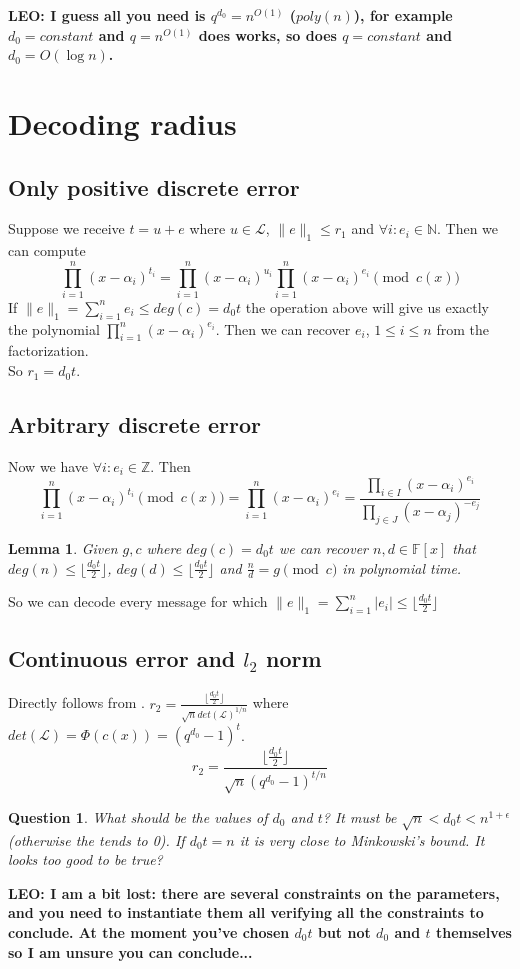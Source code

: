 \documentclass[12pt]{article}
\newcommand{\floor}[1]{\lfloor #1 \rfloor}
\newtheorem{question}{Question}
\newtheorem{lemma}{Lemma}
\begin{document}
{\bf LEO: I guess all you need is $q^{d_0} = n^{O(1)}$ ($poly(n)$), for example $d_0 = constant$ and $q=n^{O(1)}$ does works, so does $q=constant$ and $d_0 = O(\log n)$.}

\section{Decoding radius}

\subsection{Only positive discrete error}
Suppose we receive $t = u + e$ where $u \in \mathcal{L}$, $\|e\|_1 \leq r_1$ and $\forall i: e_i \in \mathbb{N}$. Then we can compute
\[
\prod_{i = 1}^{n}(x - \alpha_i)^{t_i} = \prod_{i = 1}^{n}(x - \alpha_i)^{u_i}\prod_{i = 1}^{n}(x - \alpha_i)^{e_i} \pmod{c(x)}
\]
If $\|e\|_1 = \sum_{i =1}^{n} e_i \leq deg(c) = d_0t$ the operation above will give us exactly the polynomial $\prod_{i = 1}^{n}(x - \alpha_i)^{e_i}$. Then we can recover $e_i$, $1 \leq i \leq n$ from the factorization.\\
So $r_1 = d_0t$.
\subsection{Arbitrary discrete error}
Now we have $\forall i: e_i \in \mathbb{Z}$. Then
\[
\prod_{i = 1}^{n}(x - \alpha_i)^{t_i} \pmod{c(x)} = \prod_{i = 1}^{n}(x - \alpha_i)^{e_i} = \frac{\prod_{i \in I}(x - \alpha_i)^{e_i}}{\prod_{j \in J}(x - \alpha_j)^{-e_j}}
\]
\begin{lemma}
Given $g,c$ where $deg(c) = d_0t$ we can recover $n, d \in \mathbb{F}[x]$ that $deg(n) \leq \floor{\frac{d_0t}{2}}$, $deg(d) \leq \floor{\frac{d_0t}{2}}$ and $\frac{n}{d} = g \pmod{c}$ in polynomial time.
\end{lemma}
So we can decode every message for which $\|e\|_1 = \sum_{i =1}^{n} |e_i| \leq \floor{\frac{d_0t}{2}}$

\subsection{Continuous error and $l_2$ norm}
Directly follows from \cite{[DP19]}. $r_2 = \frac{\floor{\frac{d_0t}{2}}}{\sqrt{n} det(\mathcal{L})^{1/n}}$ where $det(\mathcal{L}) = \Phi(c(x)) = (q^{d_0} - 1)^{t}$.
\[
r_2 = \frac{\floor{\frac{d_0t}{2}}}{\sqrt{n} (q^{d_0} - 1)^{t/n}}
\]
\begin{question}
What should be the values of $d_0$ and $t$? It must be $\sqrt{n} < d_0t < n^{1+\epsilon}$(otherwise the tends to 0). If $d_0t = n$ it is very close to Minkowski's bound. It looks too good to be true?
\end{question}
{\bf LEO: I am a bit lost: there are several constraints on the parameters, and you need to instantiate them all verifying all the constraints to conclude. At the moment you've chosen $d_0t$ but not $d_0$ and $t$ themselves so I am unsure you can conclude...}



\end{document}
